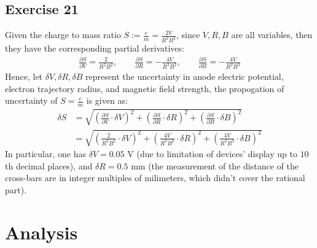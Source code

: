 \documentclass{article}
\begin{document}
\hfil

\subsection{Exercise 21}
Given the charge to mass ratio $S := \frac{e}{m} = \frac{2V}{R^2B^2}$, since $V,R,B$ are all variables, then they have the corresponding partial derivatives:
\begin{align}
    \frac{\partial S}{\partial V} = \frac{2}{R^2B^2},\quad \quad \frac{\partial S}{\partial R} = -\frac{4V}{R^3B^2},\quad \quad \frac{\partial S}{\partial B} = -\frac{4V}{R^2B^3}
\end{align}
Hence, let $\delta V,\delta R,\delta B$ represent the uncertainty in anode electric potential, electron trajectory radius, and magnetic field strength, the propogation of uncertainty of $S=\frac{e}{m}$ is given as:
\begin{align}
    \delta S &= \sqrt{\left(\frac{\partial S}{\partial V}\cdot \delta V\right)^2+\left(\frac{\partial S}{\partial R}\cdot \delta R\right)^2+\left(\frac{\partial S}{\partial B}\cdot \delta B\right)^2}\\
    &= \sqrt{\left(\frac{2}{R^2B^2}\cdot\delta V\right)^2+\left(\frac{4V}{R^3B^2}\cdot \delta R\right)^2+\left(\frac{4V}{R^2B^3}\cdot\delta B\right)^2}
\end{align}
In particular, one has $\delta V = 0.05$ V (due to limitation of devices' display up to $10$th decimal places), and $\delta R = 0.5$ mm (the measurement of the distance of the cross-bars are in integer multiples of milimeters, which didn't cover the rational part).

\newpage

\section{Analysis}
\end{document}
